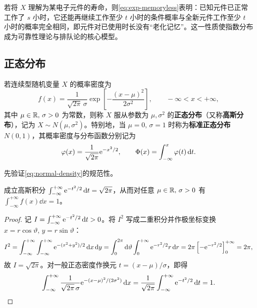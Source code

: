 若将 $X$ 理解为某电子元件的寿命，则\eqref{eq:exp-memoryless}表明：已知元件已正常工作了 $s$ 小时，它还能再继续工作至少 $t$ 小时的条件概率与全新元件工作至少 $t$ 小时的概率完全相同，即元件对已使用时长没有“老化记忆”。这一性质使指数分布成为可靠性理论与排队论的核心模型。

\subsection{正态分布}

\begin{definition}[正态分布]
\label{def:normal}
若连续型随机变量 $X$ 的概率密度为
\begin{equation}
  f(x)=\frac{1}{\sqrt{2\pi}\,\sigma}\exp\left[-\frac{(x-\mu)^2}{2\sigma^2}\right],\qquad -\infty<x<+\infty,
  \label{eq:normal-density}
\end{equation}
其中 $\mu\in\mathbb{R},\,\sigma>0$ 为常数，则称 $X$ 服从参数为 $\mu,\sigma^2$ 的\textbf{正态分布}（又称\textbf{高斯分布}），记为 $X\sim N(\mu,\sigma^2)$。特别地，当 $\mu=0,\,\sigma=1$ 时称为\textbf{标准正态分布} $N(0,1)$，其概率密度与分布函数分别记为
\begin{equation}
  \varphi(x)=\frac{1}{\sqrt{2\pi}}\mathrm{e}^{-x^2/2},\qquad
  \Phi(x)=\int_{-\infty}^{x}\varphi(t)\mathop{}\!\mathrm{d} t.
  \label{eq:std-normal}
\end{equation}
\end{definition}

先验证\eqref{eq:normal-density}的规范性。

\begin{proposition}[高斯积分与正态密度归一化]
\label{prop:gaussian-integral}
成立高斯积分 $\int_{-\infty}^{+\infty}\mathrm{e}^{-t^2/2}\mathop{}\!\mathrm{d} t=\sqrt{2\pi}$，从而对任意 $\mu\in\mathbb{R},\,\sigma>0$ 有 $\int_{-\infty}^{+\infty}f(x)\dd x=1$。
\end{proposition}
\begin{proof}
记 $I=\int_{-\infty}^{+\infty}\mathrm{e}^{-t^2/2}\mathop{}\!\mathrm{d} t>0$。将 $I^2$ 写成二重积分并作极坐标变换 $x=r\cos\vartheta,\,y=r\sin\vartheta$：
\[
  I^2=\int_{-\infty}^{+\infty}\int_{-\infty}^{+\infty}\mathrm{e}^{-(x^2+y^2)/2}\mathop{}\!\mathrm{d} x\mathop{}\!\mathrm{d} y
  =\int_{0}^{2\pi}\mathop{}\!\mathrm{d}\vartheta\int_{0}^{+\infty}\mathrm{e}^{-r^2/2}r\mathop{}\!\mathrm{d} r
  =2\pi\left[-\mathrm{e}^{-r^2/2}\right]_{0}^{+\infty}=2\pi,
\]
故 $I=\sqrt{2\pi}$。对一般正态密度作换元 $t=(x-\mu)/\sigma$，即得
\[
  \int_{-\infty}^{+\infty}\frac{1}{\sqrt{2\pi}\,\sigma}\mathrm{e}^{-(x-\mu)^2/(2\sigma^2)}\mathop{}\!\mathrm{d} x
  =\frac{1}{\sqrt{2\pi}}\int_{-\infty}^{+\infty}\mathrm{e}^{-t^2/2}\mathop{}\!\mathrm{d} t=1.
\]
\end{proof}

